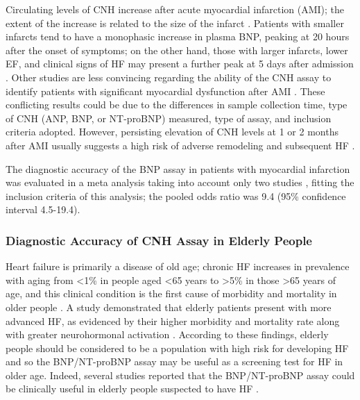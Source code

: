 \documentclass[14pt,a4paper,onecolumn]{extarticle}
\begin{document}
Circulating levels of CNH increase after acute myocardial infarction (AMI); the extent of the increase is related to the size of the infarct \citep{bib3134} \citep{bib3135} \citep{bib3136} \citep{bib3137}. Patients with smaller infarcts tend to have a monophasic increase in plasma BNP, peaking at 20 hours after the onset of symptoms; on the other hand, those with larger infarcts, lower EF, and clinical signs of HF may present a further peak at 5 days after admission \citep{bib3135}. Other studies are less convincing regarding the ability of the CNH assay to identify patients with significant myocardial dysfunction after AMI \citep{bib3138} \citep{bib3139}. These conflicting results could be due to the differences in sample collection time, type of CNH (ANP, BNP, or NT-proBNP) measured, type of assay, and inclusion criteria adopted. However, persisting elevation of CNH levels at 1 or 2 months after AMI usually suggests a high risk of adverse remodeling and subsequent HF \citep{bib35}.

The diagnostic accuracy of the BNP assay in patients with myocardial infarction was evaluated in a  meta analysis \citep{bib372} taking into account only two studies \citep{bib3140} \citep{bib3177}, fitting the inclusion criteria of this analysis; the pooled odds ratio was 9.4 (95\% confidence interval 4.5-19.4).

\subsubsection{ Diagnostic Accuracy of CNH Assay in Elderly People}

Heart failure is primarily a disease of old age; chronic HF increases in prevalence with aging from <1\% in people aged <65 years to >5\% in those >65 years of age, and this clinical condition is the first cause of morbidity and mortality in older people \citep{bib368} \citep{bib369} \citep{bib370} \citep{bib3193}. A  study demonstrated that elderly patients present with more advanced HF, as evidenced by their higher morbidity and mortality rate along with greater neurohormonal activation \citep{bib3193}. According to these findings, elderly people should be considered to be a population with high risk for developing HF and so the BNP/NT-proBNP assay may be useful as a screening test for HF in older age. Indeed, several studies reported that the BNP/NT-proBNP assay could be clinically useful in elderly people suspected to have HF \citep{bib316} \citep{bib3193} \citep{bib3143} \citep{bib3144} \citep{bib3145} \citep{bib3146} \citep{bib3147}.
\end{document}
